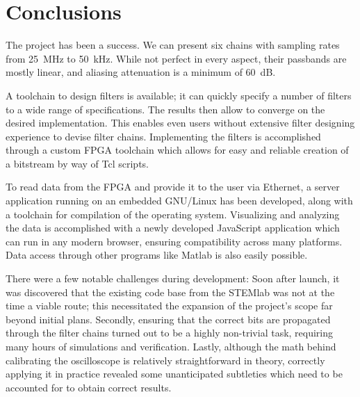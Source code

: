 %
%
\chapter{Conclusions} %
\label{ch:conclusions}
\enlargethispage{6ex}

The project has been a success. We  can present six chains with sampling rates
from  \SI{25}{\mega\Hz}  to  \SI{50}{\kilo\Hz}. While  not  perfect  in  every
aspect,  their passbands  are mostly  linear,  and aliasing  attenuation is  a
minimum of \SI{60}{\dB}.

A toolchain to design filters is available; it can quickly specify a number of
filters to a wide range of specifications.  The results then allow to converge
on  the  desired implementation. This  enables  even  users without  extensive
filter designing experience to devise filter chains.  Implementing the filters
is accomplished  through a  custom FPGA  toolchain which  allows for  easy and
reliable creation of a bitstream by way of Tcl scripts.

To read data from  the FPGA and provide it to the user  via Ethernet, a server
application running on an embedded GNU/Linux  has been developed, along with a
toolchain for compilation of the operating system.  Visualizing and analyzing
the  data  is  accomplished  with a  newly  developed  JavaScript  application
which  can run  in  any  modern browser,  ensuring  compatibility across  many
platforms. Data  access through  other  programs like  Matlab  is also  easily
possible.

There were a few notable  challenges during development: Soon after launch, it
was discovered  that the existing  code base from the  STEMlab was not  at the
time a  viable route; this necessitated  the expansion of the  project's scope
far  beyond  initial  plans. Secondly,  ensuring that  the  correct  bits  are
propagated through  the filter chains  turned out  to be a  highly non-trivial
task, requiring  many hours of simulations  and verification. Lastly, although
the  math behind  calibrating the  oscilloscope is  relatively straightforward
in  theory, correctly  applying  it in  practice  revealed some  unanticipated
subtleties which need to be accounted for to obtain correct results.

